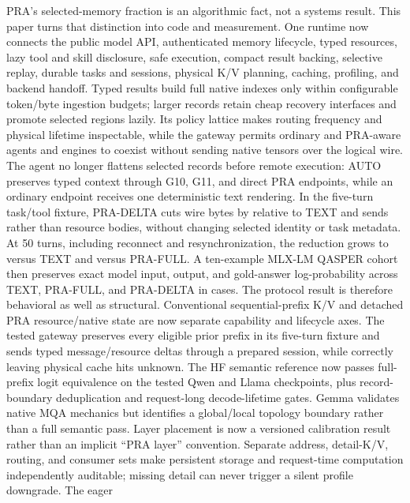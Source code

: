 \documentclass[11pt]{article}
\begin{document}
PRA's selected-memory fraction is an algorithmic fact, not a systems result.
This paper turns that distinction into code and measurement.  One runtime now
connects the public model API, authenticated memory lifecycle, typed resources,
lazy tool and skill disclosure, safe execution, compact result backing,
selective replay, durable tasks and sessions, physical K/V planning, caching,
profiling, and backend handoff. Typed results build full native indexes only
within configurable token/byte ingestion budgets; larger records retain cheap
recovery interfaces and promote selected regions lazily. Its policy lattice
makes routing frequency and physical lifetime
inspectable, while the gateway permits ordinary and PRA-aware agents and
engines to coexist without sending native tensors over the logical wire.
The agent no longer flattens selected records before remote execution: AUTO
preserves typed context through G10, G11, and direct PRA endpoints, while an
ordinary endpoint receives one deterministic text rendering. In the five-turn
task/tool fixture, PRA-DELTA cuts wire bytes by
\AgentTransportDeltaTextReduction{} relative to TEXT and sends
\AgentTransportDeltaBodies{} rather than \AgentTransportFullBodies{} resource
bodies, without changing selected identity or task metadata.
At 50 turns, including reconnect and resynchronization, the reduction grows to
\AgentScalingDeltaTextReduction{} versus TEXT and
\AgentScalingDeltaFullReduction{} versus PRA-FULL. A ten-example MLX-LM
QASPER cohort then preserves exact model input, output, and gold-answer
log-probability across TEXT, PRA-FULL, and PRA-DELTA in \AgentModelParity{}
cases. The protocol result is therefore behavioral as well as structural.
Conventional sequential-prefix K/V and detached PRA resource/native state are
now separate capability and lifecycle axes. The tested gateway preserves every
eligible prior prefix in its five-turn fixture and sends typed message/resource
deltas through a prepared session, while correctly leaving physical cache hits
unknown. The
HF semantic reference now passes full-prefix logit equivalence on the tested
Qwen and Llama checkpoints, plus record-boundary deduplication and request-long
decode-lifetime gates. Gemma validates native MQA mechanics but identifies a
global/local topology boundary rather than a full semantic pass. Layer
placement is now a versioned calibration result rather than an implicit ``PRA
layer'' convention. Separate address, detail-K/V, routing, and consumer sets
make persistent storage and request-time computation independently auditable;
missing detail can never trigger a silent profile downgrade. The eager
\end{document}
